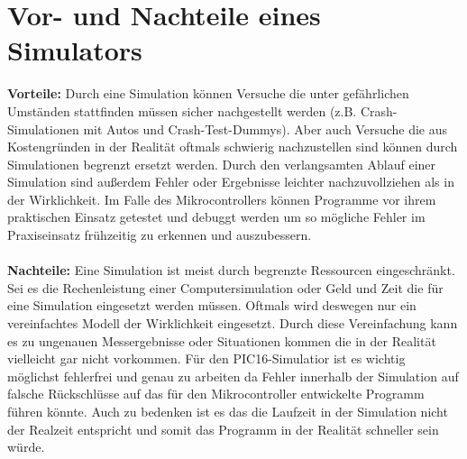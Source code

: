 \section{Vor- und Nachteile eines Simulators}

\textbf{Vorteile:}
Durch eine Simulation k\"onnen Versuche die unter gef\"ahrlichen Umst\"anden stattfinden m\"ussen sicher nachgestellt werden (z.B. Crash-Simulationen mit Autos und Crash-Test-Dummys).
Aber auch Versuche die aus Kostengr\"unden in der Realit\"at oftmals schwierig nachzustellen sind k\"onnen durch Simulationen begrenzt ersetzt werden.
Durch den verlangsamten Ablauf einer Simulation sind au\ss erdem Fehler oder Ergebnisse leichter nachzuvollziehen als in der Wirklichkeit.
Im Falle des Mikrocontrollers k\"onnen Programme vor ihrem praktischen Einsatz getestet und debuggt werden um so m\"ogliche Fehler im Praxiseinsatz fr\"uhzeitig zu erkennen und auszubessern.\\
\\
\textbf{Nachteile:}
Eine Simulation ist meist durch begrenzte Ressourcen eingeschr\"ankt. Sei es die Rechenleistung einer Computersimulation oder Geld und Zeit die f\"ur eine Simulation eingesetzt werden m\"ussen. Oftmals wird deswegen nur ein vereinfachtes Modell der Wirklichkeit eingesetzt. Durch diese Vereinfachung kann es zu ungenauen Messergebnisse oder Situationen kommen die in der Realit\"at vielleicht gar nicht vorkommen.
F\"ur den PIC16-Simulatior ist es wichtig m\"oglichst fehlerfrei und genau zu arbeiten da Fehler innerhalb der Simulation auf falsche R\"uckschl\"usse auf das f\"ur den Mikrocontroller entwickelte Programm f\"uhren k\"onnte. Auch zu bedenken ist es das die Laufzeit in der Simulation nicht der Realzeit entspricht und somit das Programm in der Realit\"at schneller sein w\"urde.